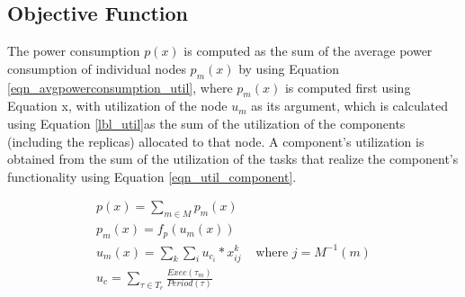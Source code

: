 
\subsection{Objective Function}
The power consumption $p(x)$ is computed as the sum of the average power consumption of individual nodes $p_m(x)$ by using Equation \ref{eqn_avgpowerconsumption_util}, where $p_m(x)$ is computed first using Equation x, with utilization of the node $u_m$ as its argument, which is calculated using Equation \ref{lbl_util}as the sum of the utilization of the components (including the replicas) allocated to that node. A component's utilization is obtained from the sum of the utilization of the tasks that realize the component's functionality using Equation \ref{eqn_util_component}.

\begin{align}
\label{eqn_avgpowerconsumption_util}
p(x) = \sum\limits_{m\in M}{p_{m}(x)}&\\
\label{lbl_power}
p_{m}(x) = f_p(u_{m}{(x)})&\\
\label{lbl_util}
u_{m}{(x)} = \sum_k{\sum_i{u_{c_i}*x^k_{ij}}} & \text{ where }j=M^{-1}(m)\\
\label{eqn_util_component}
u_c = \sum_{\tau\in T_{c}} \frac{Exec(\tau_{m})}{Period(\tau)}&
\end{align}

